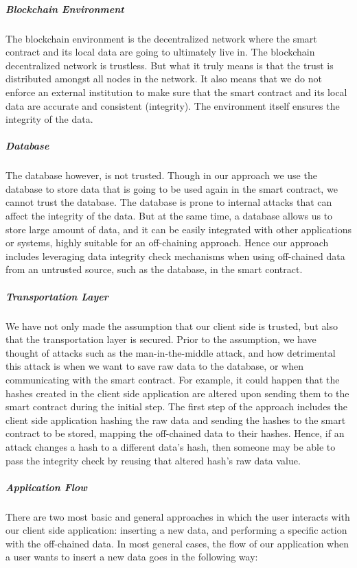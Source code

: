 \subparagraph{Blockchain Environment}
The blockchain environment is the decentralized network where the smart contract and its local data are going to ultimately live in. The blockchain decentralized network is trustless. But what it truly means is that the trust is distributed amongst all nodes in the network. It also means that we do not enforce an external institution to make sure that the smart contract and its local data are accurate and consistent (integrity). The environment itself ensures the integrity of the data.

\subparagraph{Database}
The database however, is not trusted. Though in our approach we use the database to store data that is going to be used again in the smart contract, we cannot trust the database. The database is prone to internal attacks that can affect the integrity of the data. But at the same time, a database allows us to store large amount of data, and it can be easily integrated with other applications or systems, highly suitable for an off-chaining approach. Hence our approach includes leveraging data integrity check mechanisms when using off-chained data from an untrusted source, such as the database, in the smart contract.

\subparagraph{Transportation Layer}
We have not only made the assumption that our client side is trusted, but also that the transportation layer is secured. Prior to the assumption, we have thought of attacks such as the man-in-the-middle attack, and how detrimental this attack is when we want to save raw data to the database, or when communicating with the smart contract. For example, it could happen that the hashes created in the client side application are altered upon sending them to the smart contract during the initial step. The first step of the approach includes the client side application hashing the raw data and sending the hashes to the smart contract to be stored, mapping the off-chained data to their hashes. Hence, if an attack changes a hash to a different data’s hash, then someone may be able to pass the integrity check by reusing that altered hash’s raw data value.

\subparagraph{Application Flow}
There are two most basic and general approaches in which the user interacts with our client side application: inserting a new data, and performing a specific action with the off-chained data. In most general cases, the flow of our application when a user wants to insert a new data goes in the following way: 


